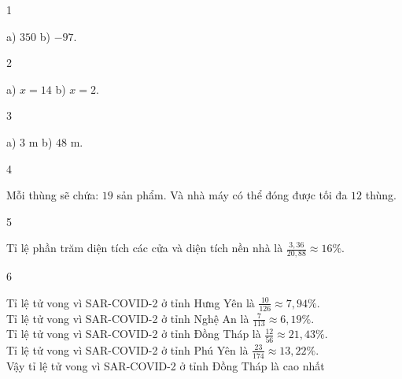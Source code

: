 \begin{Solbook}{1}
 \par \noindent a) $350$ \hfill b) $-97$.  \hfill \qedEX 
\end{Solbook}
\begin{Solbook}{2}
 \par \noindent a) $x=14$ \hfill b) $x=2$.  \hfill \qedEX 
\end{Solbook}
\begin{Solbook}{3}
 \par \noindent a) $3$ m \hfill b) $48$ m.  \hfill \qedEX 
\end{Solbook}
\begin{Solbook}{4}
 \par \noindent Mỗi thùng sẽ chứa: $19$ sản phẩm. Và nhà máy có thể đóng được tối đa $12$ thùng. \hfill \qedEX 
\end{Solbook}
\begin{Solbook}{5}
 \par \noindent Tỉ lệ phần trăm diện tích các cửa và diện tích nền nhà là $\frac {3,36}{20,88} \approx 16 \%$.  \hfill \qedEX 
\end{Solbook}
\begin{Solbook}{6}
 \par \noindent  Tỉ lệ tử vong vì SAR-COVID-2 ở tỉnh Hưng Yên là $\frac {10}{126} \approx 7,94 \%$.\\ Tỉ lệ tử vong vì SAR-COVID-2 ở tỉnh Nghệ An là $\frac {7}{113} \approx 6,19 \%$.\\ Tỉ lệ tử vong vì SAR-COVID-2 ở tỉnh Đồng Tháp là $\frac {12}{56} \approx 21,43 \%$.\\ Tỉ lệ tử vong vì SAR-COVID-2 ở tỉnh Phú Yên là $\frac {23}{174} \approx 13,22 \%$.\\ Vậy tỉ lệ tử vong vì SAR-COVID-2 ở tỉnh Đồng Tháp là cao nhất  \hfill \qedEX 
\end{Solbook}
